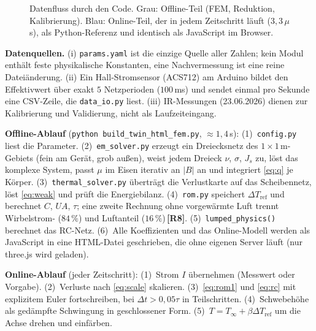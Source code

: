 \documentclass[a4paper, 10pt, conference]{ieeeconf}
\theoremstyle{remark}
\newcommand{\src}[1]{\,\textbf{[#1]}}
\begin{document}
\begin{figure}[t]
{%
}
\caption{Datenfluss durch den Code. Grau: Offline-Teil (FEM, Reduktion,
Kalibrierung). Blau: Online-Teil, der in jedem Zeitschritt läuft
($3{,}3\,\mu$s), als Python-Referenz und identisch als JavaScript im Browser.}
\label{fig:flow}
\end{figure}

\textbf{Datenquellen.} (i) \texttt{params.yaml} ist die einzige Quelle aller
Zahlen; kein Modul enthält feste physikalische Konstanten, eine
Nachvermessung ist eine reine Dateiänderung. (ii) Ein Hall-Stromsensor
(ACS712) am Arduino bildet den Effektivwert über exakt $5$ Netzperioden
($100\,$ms) und sendet einmal pro Sekunde eine CSV-Zeile, die
\texttt{data\_io.py} liest. (iii) IR-Messungen (23.06.2026) dienen zur
Kalibrierung und Validierung, nicht als Laufzeiteingang.

\textbf{Offline-Ablauf} (\texttt{python build\_twin\_html\_fem.py},
$\approx1{,}4\,$s): (1)~\texttt{config.py} liest die Parameter. (2)~\texttt{em\_solver.py}
erzeugt ein Dreiecksnetz des $1\times1\,$m-Gebiets (fein am Gerät, grob
außen), weist jedem Dreieck $\nu$, $\sigma$, $J_s$ zu, löst das komplexe
System, passt $\mu$ im Eisen iterativ an $|B|$ an und integriert
\eqref{eq:q} je Körper. (3)~\texttt{thermal\_solver.py} überträgt die
Verlustkarte auf das Scheibennetz, löst \eqref{eq:weak} und prüft die
Energiebilanz. (4)~\texttt{rom.py} speichert $\Delta T_{\mathrm{ref}}$ und
berechnet $C$, $UA$, $\tau$; eine zweite Rechnung ohne vorgewärmte Luft
trennt Wirbelstrom- ($84\,\%$) und Luftanteil ($16\,\%$)\src{R8}.
(5)~\texttt{lumped\_physics()} berechnet das RC-Netz. (6)~Alle Koeffizienten
und das Online-Modell werden als JavaScript in eine HTML-Datei geschrieben,
die ohne eigenen Server läuft (nur three.js wird geladen).

\textbf{Online-Ablauf} (jeder Zeitschritt): (1)~Strom $I$ übernehmen
(Messwert oder Vorgabe). (2)~Verluste nach \eqref{eq:scale} skalieren.
(3)~\eqref{eq:rom1} und \eqref{eq:rc} mit explizitem Euler fortschreiben,
bei $\Delta t>0{,}05\tau$ in Teilschritten. (4)~Schwebehöhe als gedämpfte
Schwingung in geschlossener Form. (5)~$T=T_\infty+\beta\Delta
T_{\mathrm{ref}}$ um die Achse drehen und einfärben.
\end{document}
